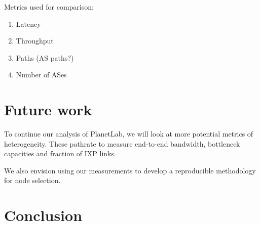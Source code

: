 \documentclass{sig-alternate-10pt}
\begin{document}
Metrics used for comparison:

\begin{enumerate}
\item Latency
\item Throughput
\item Paths (AS paths?)
\item Number of ASes
\end{enumerate}

\section{Future work}

To continue our analysis of PlanetLab, we will look at more potential metrics of 
heterogeneity. These pathrate to measure end-to-end bandwidth, bottleneck capacities 
and fraction of IXP links.

We also envision using our measurements to develop a reproducible methodology for 
node selection. 

\section{Conclusion}




\end{document}
